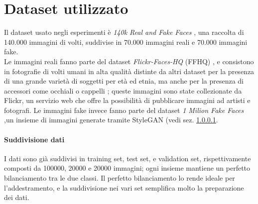\section{Dataset utilizzato}
Il dataset usato negli esperimenti è \textit{140k Real and Fake Faces} \cite{140kRealFake}, una raccolta di 140.000 immagini di volti, suddivise in 70.000  immagini reali e 70.000 immagini fake.\\
Le immagini reali fanno parte del dataset \textit{Flickr-Faces-HQ} (FFHQ) \cite{NVlabsFfhqdataset2025}, e consistono in fotografie di volti umani in alta qualità distinte da altri dataset per la presenza di una grande varietà di soggetti per età ed etnia, ma anche per la presenza di accessori come occhiali o cappelli \cite{karras2019style}; queste immagini sono state collezionate da Flickr, un servizio web che offre la possibilità di pubblicare immagini ad artisti e fotografi.
Le immagini fake invece fanno parte del dataset \textit{1 Milion Fake Faces} ,un insieme di immagini generate tramite StyleGAN (vedi sez. \ref{}.
\paragraph{Suddivisione dati} I dati sono già suddivisi in training set, test set, e validation set, rispettivamente composti da 100000, 20000 e 20000 immagini; ogni insieme mantiene un perfetto bilanciamento tra le due classi. Il perfetto bilanciamento lo rende ideale per l'addestramento, e la suddivisione nei vari set semplifica molto la preparazione dei dati.
